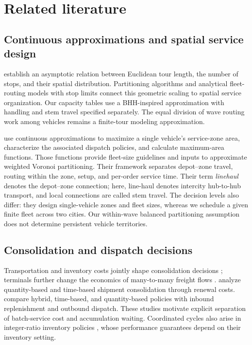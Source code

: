 \section{Related literature}
\label{sec:related}

\subsection{Continuous approximations and spatial service design}

\citet{Beardwood1959} establish an asymptotic relation between Euclidean tour length, the number of stops, and their spatial distribution. Partitioning algorithms \citep{Karp1977} and analytical fleet-routing models with stop limits \citep{Daganzo1984} connect this geometric scaling to spatial service organization. Our capacity tables use a BHH-inspired approximation with handling and stem travel specified separately. The equal division of wave routing work among vehicles remains a finite-tour modeling approximation.

\citet{Banerjee2022} use continuous approximations to maximize a single vehicle's service-zone area, characterize the associated dispatch policies, and calculate maximum-area functions. Those functions provide fleet-size guidelines and inputs to approximate weighted Voronoi partitioning. Their framework separates depot--zone travel, routing within the zone, setup, and per-order service time. Their term \emph{linehaul} denotes the depot--zone connection; here, line-haul denotes intercity hub-to-hub transport, and local connections are called stem travel. The decision levels also differ: they design single-vehicle zones and fleet sizes, whereas we schedule a given finite fleet across two cities. Our within-wave balanced partitioning assumption does not determine persistent vehicle territories.

\subsection{Consolidation and dispatch decisions}

Transportation and inventory costs jointly shape consolidation decisions \citep{Burns1985}; terminals further change the economics of many-to-many freight flows \citep{Daganzo1987}. \citet{CetinkayaBookbinder2003} analyze quantity-based and time-based shipment consolidation through renewal costs. \citet{Wei2023} compare hybrid, time-based, and quantity-based policies with inbound replenishment and outbound dispatch. These studies motivate explicit separation of batch-service cost and accumulation waiting. Coordinated cycles also arise in integer-ratio inventory policies \citep{Roundy1985}, whose performance guarantees depend on their inventory setting.

